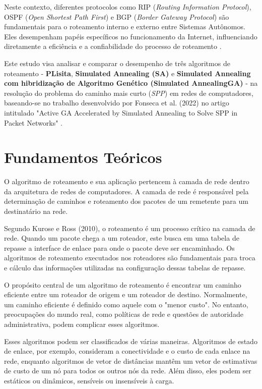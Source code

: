 \documentclass[conference]{IEEEtran}
\begin{document}
Neste contexto, diferentes protocolos como RIP (\textit{Routing Information Protocol}), OSPF (\textit{Open Shortest Path First}) e BGP (\textit{Border Gateway Protocol}) são fundamentais para o roteamento interno e externo entre Sistemas Autônomos. Eles desempenham papéis específicos no funcionamento da Internet, influenciando diretamente a eficiência e a confiabilidade do processo de roteamento \cite{KuroseRoss2010}.

Este estudo visa analisar e comparar o desempenho de três algoritmos de roteamento - \textbf{PLisita}, \textbf{Simulated Annealing (SA)} e \textbf{Simulated Annealing com hibridização de Algoritmo Genético (Simulated AnnealingGA)} - na resolução do problema do caminho mais curto (\textit{SPP}) em redes de computadores, baseando-se no trabalho desenvolvido por Fonseca et al. (2022) no artigo intitulado "Active GA Accelerated by Simulated Annealing to Solve SPP in Packet Networks" \cite{OL2ARouter}.

\section{Fundamentos Teóricos}

O algoritmo de roteamento e sua aplicação pertencem à camada de rede dentro da arquitetura de redes de computadores. A camada de rede é responsável pela determinação de caminhos e roteamento dos pacotes de um remetente para um destinatário na rede.

Segundo Kurose e Ross (2010), o roteamento é um processo crítico na camada de rede. Quando um pacote chega a um roteador, este busca em uma tabela de repasse a interface de enlace para onde o pacote deve ser encaminhado. Os algoritmos de roteamento executados nos roteadores são fundamentais para troca e cálculo das informações utilizadas na configuração dessas tabelas de repasse.

O propósito central de um algoritmo de roteamento é encontrar um caminho eficiente entre um roteador de origem e um roteador de destino. Normalmente, um caminho eficiente é definido como aquele com o "menor custo". No entanto, preocupações do mundo real, como políticas de rede e questões de autoridade administrativa, podem complicar esses algoritmos.

Esses algoritmos podem ser classificados de várias maneiras. Algoritmos de estado de enlace, por exemplo, consideram a conectividade e o custo de cada enlace na rede, enquanto algoritmos de vetor de distâncias mantêm um vetor de estimativas de custo de um nó para todos os outros nós da rede. Além disso, eles podem ser estáticos ou dinâmicos, sensíveis ou insensíveis à carga.
\end{document}
